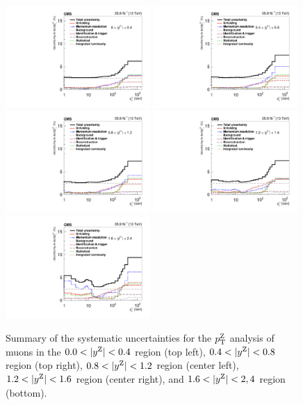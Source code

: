 \begin{figure}
	\centering
	\includegraphics[width=0.49\textwidth]{figures/zpt/histoUnfoldingSystPtRap0_nsel0_dy3.pdf}
	\includegraphics[width=0.49\textwidth]{figures/zpt/histoUnfoldingSystPtRap1_nsel0_dy3.pdf}
	\includegraphics[width=0.49\textwidth]{figures/zpt/histoUnfoldingSystPtRap2_nsel0_dy3.pdf}
	\includegraphics[width=0.49\textwidth]{figures/zpt/histoUnfoldingSystPtRap3_nsel0_dy3.pdf}
	\includegraphics[width=0.49\textwidth]{figures/zpt/histoUnfoldingSystPtRap4_nsel0_dy3.pdf}
	\caption{Summary of the systematic uncertainties for the $p_{\mathrm{T}}^{\mathrm{Z}}$ analysis of muons in the 
	$0.0 < |y^{\mathrm{Z}}| < 0.4$ region (top left), $0.4 < |y^{\mathrm{Z}}| < 0.8$ region (top right),
	$0.8 < |y^{\mathrm{Z}}| < 1.2$ region (center left), $1.2 < |y^{\mathrm{Z}}| < 1.6$ region (center right), and 
	$1.6 < |y^{\mathrm{Z}}| < 2,4$ region (bottom).
	}
	\label{fig:zpt_syst1}
\end{figure}

